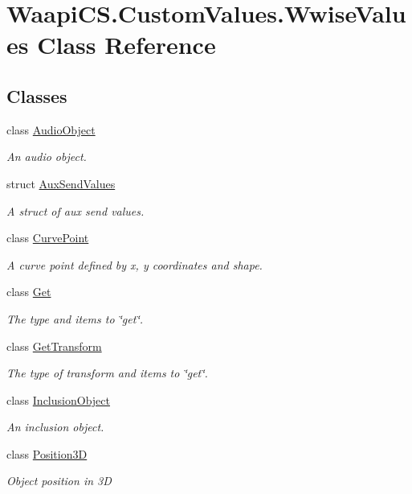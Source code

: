 \hypertarget{class_waapi_c_s_1_1_custom_values_1_1_wwise_values}{}\section{Waapi\+C\+S.\+Custom\+Values.\+Wwise\+Values Class Reference}
\label{class_waapi_c_s_1_1_custom_values_1_1_wwise_values}
\subsection*{Classes}
\begin{DoxyCompactItemize}
\item 
class \mbox{\hyperlink{class_waapi_c_s_1_1_custom_values_1_1_wwise_values_1_1_audio_object}{Audio\+Object}}
\begin{DoxyCompactList}\small\item\em An audio object. \end{DoxyCompactList}\item 
struct \mbox{\hyperlink{struct_waapi_c_s_1_1_custom_values_1_1_wwise_values_1_1_aux_send_values}{Aux\+Send\+Values}}
\begin{DoxyCompactList}\small\item\em A struct of aux send values. \end{DoxyCompactList}\item 
class \mbox{\hyperlink{class_waapi_c_s_1_1_custom_values_1_1_wwise_values_1_1_curve_point}{Curve\+Point}}
\begin{DoxyCompactList}\small\item\em A curve point defined by x, y coordinates and shape. \end{DoxyCompactList}\item 
class \mbox{\hyperlink{class_waapi_c_s_1_1_custom_values_1_1_wwise_values_1_1_get}{Get}}
\begin{DoxyCompactList}\small\item\em The type and items to \char`\"{}get\char`\"{}. \end{DoxyCompactList}\item 
class \mbox{\hyperlink{class_waapi_c_s_1_1_custom_values_1_1_wwise_values_1_1_get_transform}{Get\+Transform}}
\begin{DoxyCompactList}\small\item\em The type of transform and items to \char`\"{}get\char`\"{}. \end{DoxyCompactList}\item 
class \mbox{\hyperlink{class_waapi_c_s_1_1_custom_values_1_1_wwise_values_1_1_inclusion_object}{Inclusion\+Object}}
\begin{DoxyCompactList}\small\item\em An inclusion object. \end{DoxyCompactList}\item 
class \mbox{\hyperlink{class_waapi_c_s_1_1_custom_values_1_1_wwise_values_1_1_position3_d}{Position3D}}
\begin{DoxyCompactList}\small\item\em Object position in 3D \end{DoxyCompactList}\end{DoxyCompactItemize}
